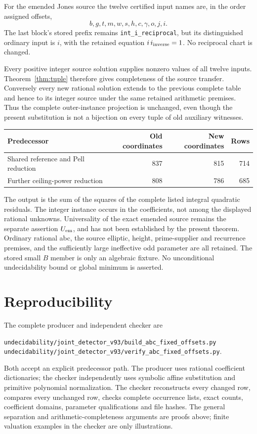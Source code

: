 \documentclass[11pt]{article}
\begin{document}
For the emended Jones source the twelve certified input names are,
in the order assigned offsets,
\[
                b,g,t,m,w,s,h,c,\gamma,o,j,i.
\]
The last block's stored prefix remains \texttt{int\_i\_reciprocal},
but its distinguished ordinary input is \(i\), with the retained
equation \(i\,i_{\rm inverse}=1\). No reciprocal chart is changed.

Every positive integer source solution supplies nonzero values of all
twelve inputs. Theorem~\ref{thm:tuple} therefore gives completeness of
the source transfer. Conversely every new rational solution extends to
the previous complete table and hence to its integer source under the
same retained arithmetic premises. Thus the complete outer-instance
projection is unchanged, even though the present substitution is not
a bijection on every tuple of old auxiliary witnesses.

\begin{center}
\begin{tabular}{lrrr}
\toprule
Predecessor & Old coordinates & New coordinates & Rows\\
\midrule
Shared reference and Pell reduction &837&815&714\\
Further ceiling-power reduction &808&786&685\\
\bottomrule
\end{tabular}
\end{center}

The output is the sum of the squares of the complete listed integral
quadratic residuals. The integer instance occurs in the coefficients,
not among the displayed rational unknowns. Universality of the exact
emended source remains the separate assertion \(U_{\rm em}\), and
has not been established by the present theorem. Ordinary rational
abc, the source elliptic, height, prime-supplier and recurrence
premises, and the sufficiently large ineffective odd parameter are
all retained. The stored small \(B\) member is only an algebraic
fixture. No unconditional undecidability bound or global minimum is
asserted.

\section{Reproducibility}

The complete producer and independent checker are
\begin{center}\small
\nolinkurl{undecidability/joint_detector_v93/build_abc_fixed_offsets.py}\\
\nolinkurl{undecidability/joint_detector_v93/verify_abc_fixed_offsets.py}.
\end{center}
Both accept an explicit predecessor path. The producer uses rational
coefficient dictionaries; the checker independently uses symbolic
affine substitution and primitive polynomial normalization. The
checker reconstructs every changed row, compares every unchanged row,
checks complete occurrence lists, exact counts, coefficient domains,
parameter qualifications and file hashes. The general separation and
arithmetic-completeness arguments are proofs above; finite valuation
examples in the checker are only illustrations.
\end{document}
